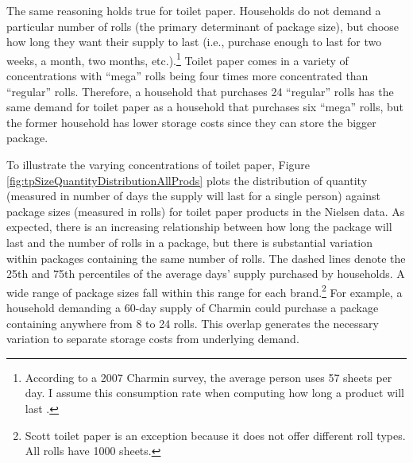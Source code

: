 \documentclass[AER]{AEA_mal}
\begin{document}
The same reasoning holds true for toilet paper. Households do not demand a particular number of rolls (the primary determinant of package size), but choose how long they want their supply to last (i.e., purchase enough to last for two weeks, a month, two months, etc.).\footnote{According to a 2007 Charmin survey, the average person uses 57 sheets per day. I assume this consumption rate when computing how long a product will last \citep{jaffe2007}.} Toilet paper comes in a variety of concentrations with ``mega'' rolls being four times more concentrated than ``regular'' rolls. Therefore, a household that purchases 24 ``regular'' rolls has the same demand for toilet paper as a household that purchases six ``mega'' rolls, but the former household has lower storage costs since they can store the bigger package.

To illustrate the varying concentrations of toilet paper, Figure \ref{fig:tpSizeQuantityDistributionAllProds} plots the distribution of quantity (measured in number of days the supply will last for a single person) against package sizes (measured in rolls) for toilet paper products in the Nielsen data. As expected, there is an increasing relationship between how long the package will last and the number of rolls in a package, but there is substantial variation within packages containing the same number of rolls. The dashed lines denote the 25th and 75th percentiles of the average days' supply purchased by households. A wide range of package sizes fall within this range for each brand.\footnote{Scott toilet paper is an exception because it does not offer different roll types. All rolls have 1000 sheets.} For example, a household demanding a 60-day supply of Charmin could purchase a package containing anywhere from 8 to 24 rolls. This overlap generates the necessary variation to separate storage costs from underlying demand.
\end{document}
